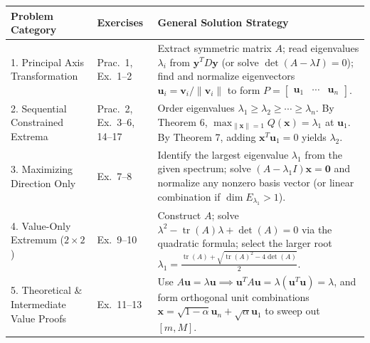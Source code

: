 \documentclass[11pt, letterpaper]{article}
\theoremstyle{definition}
\theoremstyle{remark}
\begin{document}
\renewcommand{\arraystretch}{1.5}
\begin{tabularx}{\textwidth}{l l X}
\toprule
\textbf{Problem Category} & \textbf{Exercises} & \textbf{General Solution Strategy} \\
\midrule
1. Principal Axis Transformation & Prac.\ 1, Ex.\ 1--2 & Extract symmetric matrix $A$; read eigenvalues $\lambda_i$ from $\mathbf{y}^T D \mathbf{y}$ (or solve $\det(A-\lambda I)=0$); find and normalize eigenvectors $\mathbf{u}_i = \mathbf{v}_i/\|\mathbf{v}_i\|$ to form $P = \begin{bmatrix} \mathbf{u}_1 & \cdots & \mathbf{u}_n \end{bmatrix}$. \\
2. Sequential Constrained Extrema & Prac.\ 2, Ex.\ 3--6, 14--17 & Order eigenvalues $\lambda_1 \ge \lambda_2 \ge \cdots \ge \lambda_n$. By Theorem 6, $\max_{\|\mathbf{x}\|=1} Q(\mathbf{x}) = \lambda_1$ at $\mathbf{u}_1$. By Theorem 7, adding $\mathbf{x}^T\mathbf{u}_1 = 0$ yields $\lambda_2$. \\
3. Maximizing Direction Only & Ex.\ 7--8 & Identify the largest eigenvalue $\lambda_1$ from the given spectrum; solve $(A - \lambda_1 I)\mathbf{x} = \mathbf{0}$ and normalize any nonzero basis vector (or linear combination if $\dim E_{\lambda_1} > 1$). \\
4. Value-Only Extremum ($2 \times 2$) & Ex.\ 9--10 & Construct $A$; solve $\lambda^2 - \operatorname{tr}(A)\lambda + \det(A) = 0$ via the quadratic formula; select the larger root $\lambda_1 = \frac{\operatorname{tr}(A) + \sqrt{\operatorname{tr}(A)^2 - 4\det(A)}}{2}$. \\
5. Theoretical \& Intermediate Value Proofs & Ex.\ 11--13 & Use $A\mathbf{u} = \lambda\mathbf{u} \implies \mathbf{u}^T A \mathbf{u} = \lambda(\mathbf{u}^T\mathbf{u}) = \lambda$, and form orthogonal unit combinations $\mathbf{x} = \sqrt{1-\alpha}\mathbf{u}_n + \sqrt{\alpha}\mathbf{u}_1$ to sweep out $[m, M]$. \\
\bottomrule
\end{tabularx}
\end{document}
